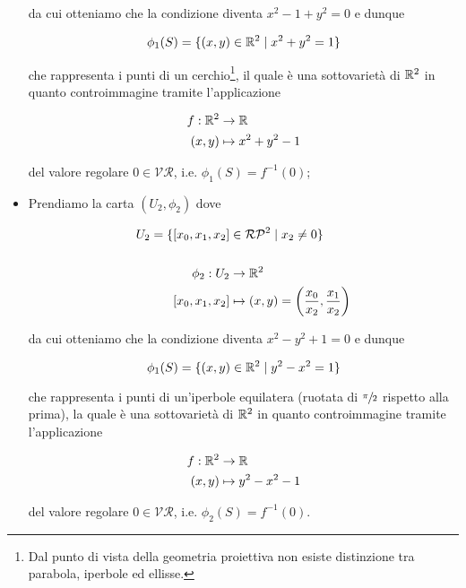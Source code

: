 \begin{itemize}
	da cui otteniamo che la condizione diventa $ x^{2} - 1 + y^{2} = 0 $ e dunque
	
	\begin{equation}
		\phi_{1}(S) = \{ (x,y) \in \mathbb{R}^{2} \mid x^{2} + y^{2} = 1 \}
	\end{equation}
	
	che rappresenta i punti di un cerchio\footnote{%
		Dal punto di vista della geometria proiettiva non esiste distinzione tra parabola, iperbole ed ellisse.%
	}, il quale è una sottovarietà di $ \mathbb{R}^{2} $ in quanto controimmagine tramite l'applicazione
	
	\begin{align}
		\begin{split}
			f : \mathbb{R}^{2} &\to \mathbb{R}\\
			(x,y) &\mapsto x^{2} + y^{2} - 1
		\end{split}
	\end{align}
	
	del valore regolare $ 0 \in \mathcal{VR} $, i.e. $ \phi_{1}(S) = f^{-1}(0) $;
	
	\item Prendiamo la carta $ (U_{2},\phi_{2}) $ dove
	
	\begin{align}
		\begin{split}
			U_{2} = \{ [x_{0},x_{1},x_{2}] &\in \mathcal{RP}^{2} \mid x_{2} \neq 0 \}\\\\
			\phi_{2} : U_{2} &\to \mathbb{R}^{2}\\
			[x_{0},x_{1},x_{2}] &\mapsto (x,y) = \left( \dfrac{x_{0}}{x_{2}}, \dfrac{x_{1}}{x_{2}} \right)
		\end{split}
	\end{align}
	
	da cui otteniamo che la condizione diventa $ x^{2} - y^{2} + 1 = 0 $ e dunque
	
	\begin{equation}
		\phi_{1}(S) = \{ (x,y) \in \mathbb{R}^{2} \mid y^{2} - x^{2} = 1 \}
	\end{equation}
	
	che rappresenta i punti di un'iperbole equilatera (ruotata di $ \sfrac{\pi}{2} $ rispetto alla prima), la quale è una sottovarietà di $ \mathbb{R}^{2} $ in quanto controimmagine tramite l'applicazione
	
	\begin{align}
		\begin{split}
			f : \mathbb{R}^{2} &\to \mathbb{R}\\
			(x,y) &\mapsto y^{2} - x^{2} - 1
		\end{split}
	\end{align}
	
	del valore regolare $ 0 \in \mathcal{VR} $, i.e. $ \phi_{2}(S) = f^{-1}(0) $.
\end{itemize}

